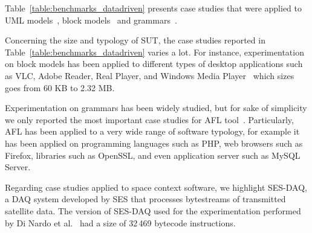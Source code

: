 Table~\ref{table:benchmarks_datadriven} presents case studies that were applied to UML models~\cite{di2017augmenting}, block models~\cite{pham2016model} and grammars~\cite{AFL:industrialcases}.

Concerning the size and typology of SUT, the case studies reported in Table~\ref{table:benchmarks_datadriven} varies a lot.
For instance, experimentation on block models has been applied to different types of desktop applications such as VLC, Adobe Reader, Real Player, and Windows Media Player~\cite{pham2016model} which sizes goes from 60 KB to 2.32 MB. 

Experimentation on grammars has been widely studied, but for sake of simplicity we only reported the most important case studies for AFL tool~\cite{AFL:industrialcases}. Particularly, AFL has been applied to a very wide range of software typology, for example it has been applied on programming languages such as PHP, web browsers such as Firefox, libraries such as OpenSSL, and even application server such as MySQL Server. 

Regarding case studies applied to space context software, we highlight SES-DAQ, a DAQ system developed by SES that processes bytestreams of transmitted satellite data. The version of SES-DAQ used for the experimentation performed by Di Nardo et al.~\cite{di2017augmenting} had a size of 32\,469 bytecode instructions.




